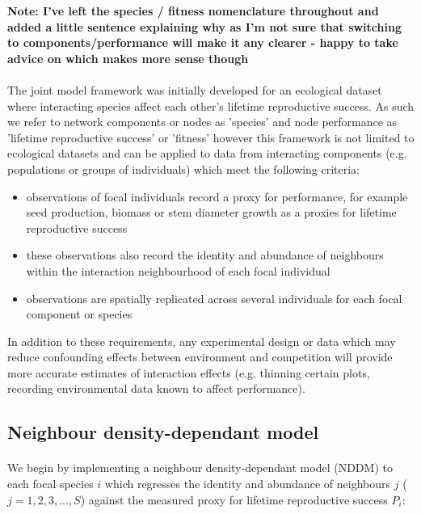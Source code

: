 \documentclass[a4,12pt]{article}
\begin{document}
\begin{itemize}
\textbf{Note: I've left the species / fitness nomenclature throughout and added a little sentence explaining why as I'm not sure that switching to components/performance will make it any clearer - happy to take advice on which makes more sense though}
    
    \paragraph{}
    The joint model framework was initially developed for an ecological dataset where interacting species affect each other's lifetime reproductive success. As such we refer to network components or nodes as 'species' and node performance as 'lifetime reproductive success' or 'fitness' however this framework is not limited to ecological datasets and can be applied to data from interacting components (e.g. populations or groups of individuals) which meet the following criteria: 
    \begin{itemize}
        \item observations of focal individuals record a proxy for performance, for example seed production, biomass or stem diameter growth as a proxies for lifetime reproductive success
        \item these observations also record the identity and abundance of neighbours within the interaction neighbourhood of each focal individual
        \item observations are spatially replicated across several individuals for each focal component or species
    \end{itemize}

    In addition to these requirements, any experimental design or data which may reduce confounding effects between environment and competition will provide more accurate estimates of interaction effects (e.g. thinning certain plots, recording environmental data known to affect performance). 
    
    \subsection{Neighbour density-dependant model}
        
        \paragraph{}
        We begin by implementing a neighbour density-dependant model (NDDM) to each focal species $i$ which regresses the identity and abundance of neighbours $j$ ($j = 1, 2, 3, ..., S$) against the measured proxy for lifetime reproductive success $P_{i}$:
        

\end{itemize}
\end{document}
